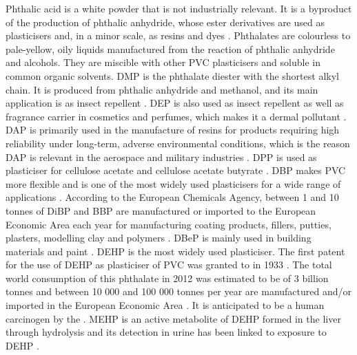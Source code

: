 Phthalic acid is a white powder that is not industrially relevant.
%
It is a byproduct of the production of phthalic anhydride, whose ester derivatives are used as plasticisers and, in a minor scale, as resins and dyes
\cite{lorz2000phthalic}.
%
Phthalates are colourless to pale-yellow, oily liquids manufactured from the reaction of phthalic anhydride and alcohols. They are miscible with other PVC plasticisers and soluble in common organic solvents. 
%
DMP is the phthalate diester with the shortest alkyl chain. It is produced from phthalic anhydride and methanol, and  its main application is as insect repellent  \cite{lowenheim1975industrial,o2013merck,brown1997insect}.
%
DEP is also used as insect repellent as well as fragrance carrier in cosmetics and perfumes, which makes it a dermal pollutant  \cite{api2001toxicological}.
%
DAP is primarily used in the manufacture of resins for products requiring high reliability under long-term, adverse environmental conditions, which is the reason DAP is relevant in the aerospace and military industries
\cite{shenoy2007modification}.
%
%
DPP is used as plasticiser for cellulose acetate and cellulose acetate butyrate \cite{fordyce1940plasticizers}.
%
DBP makes PVC more flexible and is one of the most widely used plasticisers for a wide range of applications
\cite{lorz2000phthalic,taylor2001toxicological}.
%
According to the European Chemicals Agency, between 1 and 10 tonnes of DiBP and BBP  are manufactured or imported to the European Economic Area each year for manufacturing
coating products, fillers, putties, plasters, modelling clay and polymers 
\cite{echaDiBP,echaBBP}. 
%
DBeP is mainly used in building materials and paint \cite{epaDBeP}.
%
DEHP is the most widely used plasticiser. 
%
The first patent for the use of DEHP as plasticiser of PVC was granted to \citeauthor{kyrides1933octyl} in 1933 \cite{kyrides1933octyl}.
%
The total world consumption of this phthalate in 2012 was estimated to be of 3 billion tonnes and  between 10 000 and 100 000 tonnes per year are manufactured and/or imported in the European Economic Area \cite{doi:10.1002/14356007.a20_181.pub2,echaDEHP}.
%
It is anticipated to be a human carcinogen by the \citeauthor{us201614th} \cite{us201614th}.
%
MEHP is an active metabolite of DEHP formed in the liver through hydrolysis and its detection in urine has been linked to exposure to DEHP \cite{wittassek2008phthalates,becker2004dehp}. 







